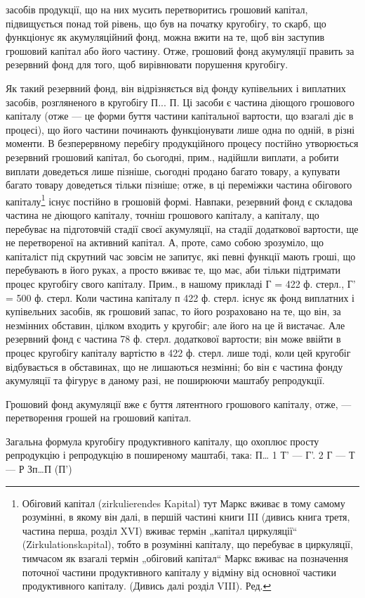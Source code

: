 \parcont{}  %
засобів продукції, що на них мусить перетворитись грошовий капітал,
підвищується понад той рівень, що був на початку кругобігу, то скарб,
що функціонує як акумуляційний фонд, можна вжити на те, щоб він
заступив грошовий капітал або його частину. Отже, грошовий фонд
акумуляції править за резервний фонд для того, щоб вирівнювати
порушення кругобігу.

Як такий резервний фонд, він відрізняється від фонду купівельних і
виплатних засобів, розгляненого в кругобігу П... П. Ці засоби є
частина діющого грошового капіталу (отже — це форми буття
частини капітальної вартости, що взагалі діє в процесі), що його частини
починають функціонувати лише одна по одній, в різні моменти. В безперервному
перебігу продукційного процесу постійно утворюється
резервний грошовий капітал, бо сьогодні, прим., надійшли виплати, а
робити виплати доведеться лише пізніше, сьогодні продано багато товару,
а купувати багато товару доведеться тільки пізніше; отже, в ці переміжки
частина обігового капіталу\footnote*{
Обіговий капітал (zirkulierendes Kapital) тут Маркс вживає в тому самому
розумінні, в якому він далі, в першій частині книги III (дивись книга третя,
частина перша, розділ XVI) вживає термін „капітал циркуляції“ (Zirkulationskapital),
тобто в розумінні капіталу, що перебуває в циркуляції, тимчасом як взагалі термін
„обіговий капітал“ Маркс вживає на позначення поточної частини продуктивного
капіталу у відміну від основної частики продуктивного капіталу. (Дивись далі
розділ VIII). Ред.
} існує постійно в грошовій формі.
Навпаки, резервний фонд є складова частина не діющого капіталу,
точніш грошового капіталу, а капіталу, що перебуває на підготовчій
стадії своєї акумуляції, на стадії додаткової вартости, ще не
перетвореної на активний капітал. А, проте, само собою зрозуміло, що
капіталіст під скрутний час зовсім не запитує, які певні функції мають
гроші, що перебувають в його руках, а просто вживає те, що має,
аби тільки підтримати процес кругобігу свого капіталу. Прим., в нашому
прикладі Г = 422 ф. стерл., Г' = 500 ф. стерл. Коли частина капіталу
п 422 ф. стерл. існує як фонд виплатних і купівельних засобів, як грошовий
запас, то його розраховано на те, що він, за незмінних обставин,
цілком входить у кругобіг; але його на це й вистачає. Але резервний
фонд є частина 78 ф. стерл. додаткової вартости; він може
ввійти в процес кругобігу капіталу вартістю в 422 ф. стерл. лише тоді,
коли цей кругобіг відбувається в обставинах, що не лишаються незмінні;
бо він є частина фонду акумуляції та фігурує в даному разі,
не поширюючи маштабу репродукції.

Грошовий фонд акумуляції вже є буття лятентного грошового капіталу,
отже, — перетворення грошей на грошовий капітал.

Загальна формула кругобігу продуктивного капіталу, що охоплює
просту репродукцію і репродукцію в поширеному маштабі, така:
П… 1 Т' — Г'. 2 Г — Т — Р Зп…П (П')
